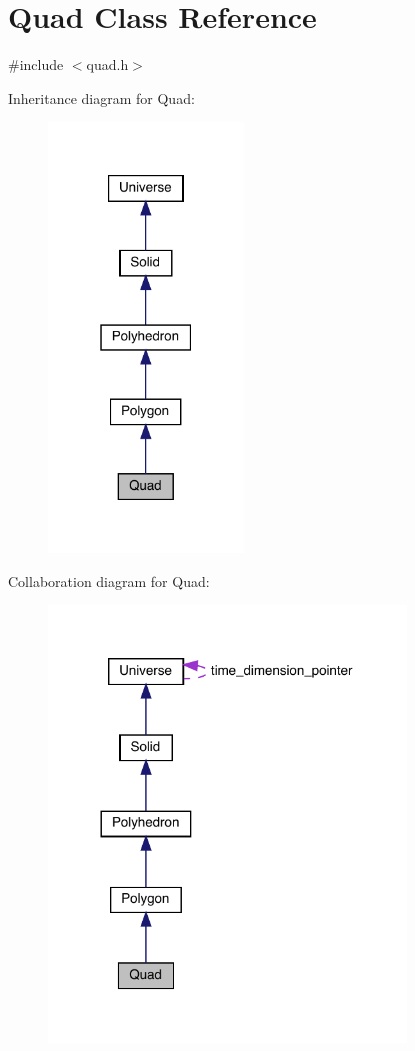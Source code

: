 \hypertarget{class_quad}{}\section{Quad Class Reference}
\label{class_quad}


{\ttfamily \#include $<$quad.\+h$>$}



Inheritance diagram for Quad\+:\nopagebreak
\begin{figure}[H]
\begin{center}
\leavevmode
\includegraphics[width=147pt]{class_quad__inherit__graph}
\end{center}
\end{figure}


Collaboration diagram for Quad\+:\nopagebreak
\begin{figure}[H]
\begin{center}
\leavevmode
\includegraphics[width=269pt]{class_quad__coll__graph}
\end{center}
\end{figure}
